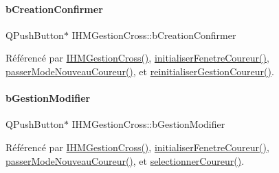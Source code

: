 \mbox{\label{class_i_h_m_gestion_cross_aac8a7363e20bc9ba2f65b7d9b3bc856e}} 
\paragraph{\texorpdfstring{b\+Creation\+Confirmer}{bCreationConfirmer}}
{\footnotesize\ttfamily Q\+Push\+Button$\ast$ I\+H\+M\+Gestion\+Cross\+::b\+Creation\+Confirmer\hspace{0.3cm}{\ttfamily [private]}}



Référencé par \hyperlink{class_i_h_m_gestion_cross_a2c62fd83326a87456a403f46acc408c8}{I\+H\+M\+Gestion\+Cross()}, \hyperlink{class_i_h_m_gestion_cross_aa5d9de499a66e52b843c4ef4c6074a60}{initialiser\+Fenetre\+Coureur()}, \hyperlink{class_i_h_m_gestion_cross_ac8f336c95a5f0c9eb8a4bc1c4bb83445}{passer\+Mode\+Nouveau\+Coureur()}, et \hyperlink{class_i_h_m_gestion_cross_a85c44933ec0dcbb591e01c832063367e}{reinitialiser\+Gestion\+Coureur()}.

\mbox{\label{class_i_h_m_gestion_cross_a524ced9992dcc4e7ee25b01e30c4c5df}} 
\paragraph{\texorpdfstring{b\+Gestion\+Modifier}{bGestionModifier}}
{\footnotesize\ttfamily Q\+Push\+Button$\ast$ I\+H\+M\+Gestion\+Cross\+::b\+Gestion\+Modifier\hspace{0.3cm}{\ttfamily [private]}}



Référencé par \hyperlink{class_i_h_m_gestion_cross_a2c62fd83326a87456a403f46acc408c8}{I\+H\+M\+Gestion\+Cross()}, \hyperlink{class_i_h_m_gestion_cross_aa5d9de499a66e52b843c4ef4c6074a60}{initialiser\+Fenetre\+Coureur()}, \hyperlink{class_i_h_m_gestion_cross_ac8f336c95a5f0c9eb8a4bc1c4bb83445}{passer\+Mode\+Nouveau\+Coureur()}, et \hyperlink{class_i_h_m_gestion_cross_ad71963d500fd61995fdae94e833db163}{selectionner\+Coureur()}.

